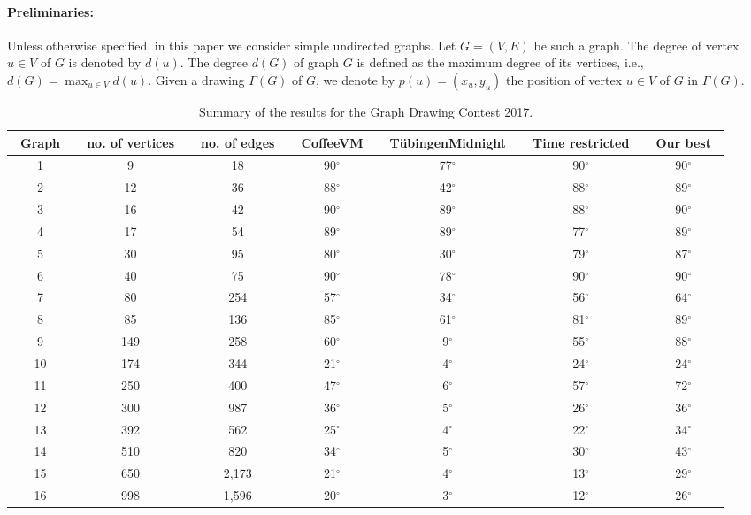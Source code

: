 \documentclass{comjnl}
\begin{document}
\paragraph{Preliminaries:}
Unless otherwise specified, in this paper we consider simple undirected graphs. Let $G=(V,E)$ be such a graph. The degree of vertex $u\in V$ of $G$ is denoted by $d(u)$. The degree $d(G)$ of  graph $G$ is defined as the maximum degree of its vertices, i.e., $d(G)=\max_{u\in V}d(u)$. Given a drawing $\Gamma(G)$ of $G$, we denote by $p(u)=(x_u,y_u)$ the position of vertex $u \in V$ of $G$ in $\Gamma(G)$. 


\begin{table}
\caption{Summary of the results for the Graph Drawing Contest 2017.}
\centering
\begin{tabular}{c|c|c|c|c|c|c}
\toprule
\rowcolor{gray!30!}~Graph~ & ~no. of vertices~ & ~no. of edges~ & ~CoffeeVM~ & ~T\"ubingenMidnight~ & ~Time restricted~ & ~Our best~ \\
\midrule
\rowcolor{gray!30!} 1  &  9  & 18    & 90$^\circ$ & 77$^\circ$ & 90$^\circ$ & 90$^\circ$\\
\rowcolor{gray!00!} 2  & 12  & 36    & 88$^\circ$ & 42$^\circ$ & 88$^\circ$ & 89$^\circ$\\
\rowcolor{gray!30!} 3  & 16  & 42    & 90$^\circ$ & 89$^\circ$ & 88$^\circ$ & 90$^\circ$\\
\rowcolor{gray!00!} 4  & 17  & 54    & 89$^\circ$ & 89$^\circ$ & 77$^\circ$ & 89$^\circ$\\
\rowcolor{gray!30!} 5  & 30  & 95    & 80$^\circ$ & 30$^\circ$ & 79$^\circ$ & 87$^\circ$\\
\rowcolor{gray!00!} 6  & 40  & 75    & 90$^\circ$ & 78$^\circ$ & 90$^\circ$ & 90$^\circ$\\
\rowcolor{gray!30!} 7  & 80  & 254   & 57$^\circ$ & 34$^\circ$ & 56$^\circ$ & 64$^\circ$\\
\rowcolor{gray!00!} 8  & 85  & 136   & 85$^\circ$ & 61$^\circ$ & 81$^\circ$ & 89$^\circ$\\
\rowcolor{gray!30!} 9  & 149 & 258   & 60$^\circ$ & 9$^\circ$  & 55$^\circ$ & 88$^\circ$\\
\rowcolor{gray!00!} 10 & 174 & 344   & 21$^\circ$ & 4$^\circ$  & 24$^\circ$ & 24$^\circ$\\
\rowcolor{gray!30!} 11 & 250 & 400   & 47$^\circ$ & 6$^\circ$  & 57$^\circ$ & 72$^\circ$\\
\rowcolor{gray!00!} 12 & 300 & 987   & 36$^\circ$ & 5$^\circ$  & 26$^\circ$ & 36$^\circ$\\
\rowcolor{gray!30!} 13 & 392 & 562   & 25$^\circ$ & 4$^\circ$  & 22$^\circ$ & 34$^\circ$\\
\rowcolor{gray!00!} 14 & 510 & 820   & 34$^\circ$ & 5$^\circ$  & 30$^\circ$ & 43$^\circ$\\
\rowcolor{gray!30!} 15 & 650 & 2,173 & 21$^\circ$ & 4$^\circ$  & 13$^\circ$ & 29$^\circ$\\
\rowcolor{gray!00!} 16 & 998 & 1,596 & 20$^\circ$ & 3$^\circ$  & 12$^\circ$ & 26$^\circ$\\
\bottomrule
\end{tabular}
\label{tab:gdContest2017}
\end{table}
\end{document}
